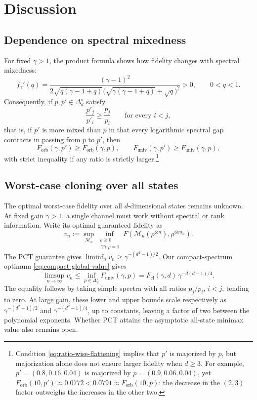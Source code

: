 \documentclass[11pt]{article}
\theoremstyle{remark}
\theoremstyle{plain}
\newcommand{\cM}{\mathcal M}
\newcommand{\Tr}{\operatorname{Tr}}
\newcommand{\ot}{\otimes}
\newcommand{\Forb}{F_{\mathrm{orb}}}
\newcommand{\Fcl}{F_{\mathrm{cl}}}
\newcommand{\Funiv}{F_{\mathrm{univ}}}
\begin{document}
\section{Discussion}
\label{sec:discussions}

\subsection{Dependence on spectral mixedness}\label{sec:spectral-mixedness}
For fixed \(\gamma>1\), the product formula shows how fidelity changes
with spectral mixedness:
\[
  f_\gamma'(q)
  =\frac{(\gamma-1)^2}
  {2\sqrt{q(\gamma-1+q)}
   \bigl(\sqrt{\gamma(\gamma-1+q)}+\sqrt q\bigr)^2}>0,
  \qquad 0<q<1.
\]
Consequently, if \(p,p'\in\Delta_d^\circ\) satisfy
\begin{equation}\label{eq:ratio-wise-flattening}
  \frac{p'_j}{p'_i}\ge \frac{p_j}{p_i}
  \qquad\text{for every }i<j,
\end{equation}
that is, if $p'$ is more mixed than $p$ in that every logarithmic spectral gap contracts in passing from \(p\)
to \(p'\), then
\begin{equation}\label{eq:ratio-wise-fidelity-monotonicity}
  \Forb(\gamma,p')\ge \Forb(\gamma,p),
  \qquad
  \Funiv(\gamma,p')\ge \Funiv(\gamma,p),
\end{equation}
with strict inequality if any ratio is strictly larger.\footnote{Condition \eqref{eq:ratio-wise-flattening} implies that \(p'\) is
majorized by \(p\), but majorization alone does not ensure larger
fidelity when \(d\ge3\).  For example,
\(p'=(0.8,0.16,0.04)\) is majorized by \(p=(0.9,0.06,0.04)\), yet
\(\Forb(10,p')\approx0.0772<0.0791\approx\Forb(10,p)\): the decrease
in the \((2,3)\) factor outweighs the increases in the other two.}


\subsection{Worst-case cloning over all states}
The optimal worst-case fidelity over all \(d\)-dimensional states remains
unknown.  At fixed gain \(\gamma>1\), a single channel must work without
spectral or rank information. Write its optimal guaranteed fidelity as
\begin{equation}\label{eq:uniform-state-minimax-value}
  v_n:=\sup_{\cM_n}\inf_{\substack{\rho\ge0\\\Tr\rho=1}}
  F\!\left(\cM_n(\rho^{\ot n}),\rho^{\ot m_n}\right).
\end{equation}
The PCT guarantee gives
\(\liminf_n v_n\ge\gamma^{-(d^2-1)/2}\).  Our
compact-spectrum optimum \eqref{eq:compact-global-value} gives
\begin{equation}\label{eq:uniform-state-minimax-upper-bound}
  \limsup_{n\to\infty}v_n
  \le\inf_{p\in\Delta_d^\circ}\Funiv(\gamma,p)
  =\Fcl(\gamma,d)\,\gamma^{-d(d-1)/4}.
\end{equation}
The equality follows by taking simple spectra with all ratios
\(p_j/p_i\), \(i<j\), tending to zero.
At large gain, these lower and upper bounds scale respectively as
\(\gamma^{-(d^2-1)/2}\) and \(\gamma^{-(d^2-1)/4}\), up to
constants, leaving a factor of two between the polynomial exponents.
Whether PCT attains the asymptotic all-state minimax value also remains
open.
\end{document}
